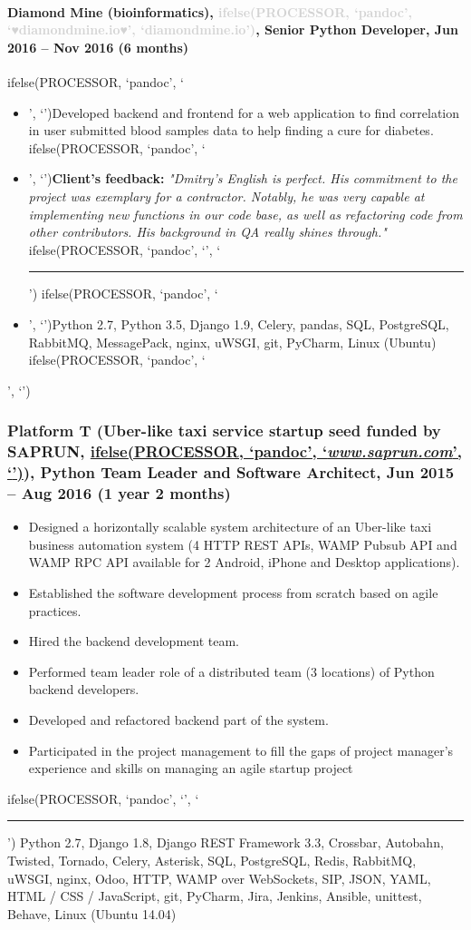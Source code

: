 \documentclass[a4paper,8pt]{extarticle}
\newcommand{\chref}[2]{\href{#1}
{ifelse(PROCESSOR, `pandoc', `#2', `\underline{\smash{#2}}')}}
\newcommand{\itchref}[2]{\chref{#1}{\textit{#2}}}  %
\newcommand{\chrule}{ifelse(PROCESSOR, `pandoc', `', `\vspace{3pt}\hrule')}
\newcommand{\brokenhreflg}[1]{\textcolor{lightgray}{ifelse(PROCESSOR, `pandoc', `♥#1♥', `#1')}}
\newcommand{\pdbeginitemize}{ifelse(PROCESSOR, `pandoc', `\begin{itemize}', `')}
\newcommand{\pditem}{ifelse(PROCESSOR, `pandoc', `\item', `')}
\newcommand{\pdenditemize}{ifelse(PROCESSOR, `pandoc', `\end{itemize}', `')}
\begin{document}
\paragraph*{Diamond Mine (bioinformatics), \brokenhreflg{diamondmine.io}, Senior Python Developer, Jun 2016 -- Nov 2016 (6 months)}
\pdbeginitemize
\pditem Developed backend and frontend for a web application to find correlation in user submitted blood samples data to help finding a cure for diabetes.\\
\pditem \textbf{Client's feedback:} \textit{"Dmitry's English is perfect. His commitment to the project was exemplary for a contractor. Notably, he was very capable at implementing new functions in our code base, as well as refactoring code from other contributors. His background in QA really shines through."}
\chrule
\pditem Python 2.7, Python 3.5, Django 1.9, Celery, pandas, SQL, PostgreSQL, RabbitMQ, MessagePack, nginx, uWSGI, git, PyCharm, Linux (Ubuntu)
\pdenditemize

\subsubsection*{Platform T (Uber-like taxi service startup seed funded by SAPRUN, \itchref{https://www.saprun.com}{www.saprun.com}), Python Team Leader and Software Architect, Jun 2015 – Aug 2016 (1 year 2 months)}
\begin{itemize}
    \item Designed a horizontally scalable system architecture of an Uber-like taxi business automation system (4 HTTP REST APIs, WAMP Pubsub API and WAMP RPC API available for 2 Android, iPhone and Desktop applications).
    \item Established the software development process from scratch based on agile practices.
    \item Hired the backend development team.
    \item Performed team leader role of a distributed team (3 locations) of Python backend developers.
    \item Developed and refactored backend part of the system.
    \item Participated in the project management to fill the gaps of project manager's experience and skills on managing an agile startup project
\end{itemize}
\chrule
Python 2.7, Django 1.8, Django REST Framework 3.3, Crossbar, Autobahn, Twisted, Tornado, Celery, Asterisk, SQL, PostgreSQL, Redis, RabbitMQ, uWSGI, nginx, Odoo, HTTP, WAMP over WebSockets, SIP, JSON, YAML, HTML / CSS / JavaScript, git, PyCharm, Jira, Jenkins, Ansible, unittest, Behave, Linux (Ubuntu 14.04)
\end{document}
